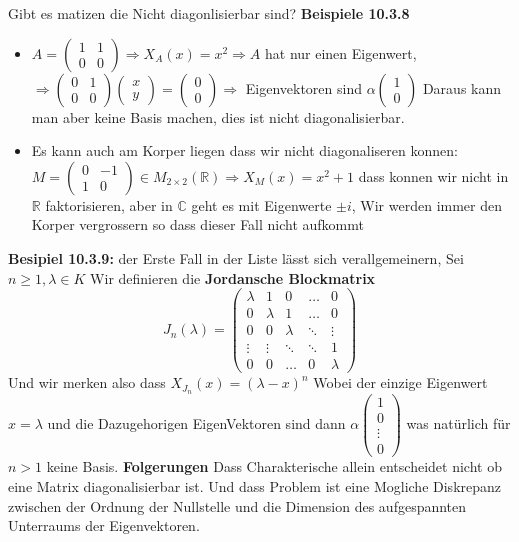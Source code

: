 \documentclass{article}
\begin{document}
Gibt es matizen die Nicht diagonlisierbar sind?\newline
\textbf{Beispiele 10.3.8} \begin{itemize}
  \item{$A=\begin{pmatrix}1&1\\0&0\end{pmatrix}\Rightarrow X_A(x)=x^2\Rightarrow A$ hat nur einen Eigenwert, $\Rightarrow\begin{pmatrix}0&1\\0&0\end{pmatrix}\begin{pmatrix}x\\y\end{pmatrix}=\begin{pmatrix}0\\0\end{pmatrix}\Rightarrow$ Eigenvektoren sind $\alpha \begin{pmatrix}1\\0\end{pmatrix}$ Daraus kann man aber keine Basis machen, dies ist nicht diagonalisierbar.}
  \item{Es kann auch am Korper liegen dass wir nicht diagonaliseren konnen: $M=\begin{pmatrix}0&-1\\1&0\end{pmatrix}\in M_{2\times2}(\mathbb{R})\Rightarrow X_M(x)=x^2+1$ dass konnen wir nicht in $\mathbb{R}$ faktorisieren, aber in $\mathbb{C}$ geht es mit Eigenwerte $\pm i$, Wir werden immer den Korper vergrossern so dass dieser Fall nicht aufkommt}    
  \end{itemize}
  \textbf{Besipiel 10.3.9:} der Erste Fall in der Liste lässt sich verallgemeinern, Sei $n\ge1, \lambda \in K$ Wir definieren die \textbf{Jordansche Blockmatrix} \[J_n(\lambda)=\begin{pmatrix}
\lambda & 1 & 0 & \dots & 0 \\
0 & \lambda & 1 & \dots & 0 \\
0 & 0 & \lambda & \ddots & \vdots \\
\vdots & \vdots & \ddots & \ddots & 1 \\
0 & 0 & \dots & 0 & \lambda
\end{pmatrix}\]
Und wir merken also dass $X_{J_n}(x)=(\lambda-x)^n$ Wobei der einzige Eigenwert $x=\lambda$ und die Dazugehorigen EigenVektoren sind dann $\alpha \begin{pmatrix}1\\0\\\vdots\\0\end{pmatrix}$ was natürlich für $n>1$ keine Basis.
\newline
\textbf{Folgerungen} Dass Charakterische allein entscheidet nicht ob eine Matrix diagonalisierbar ist. Und dass Problem ist eine Mogliche Diskrepanz zwischen der Ordnung der Nullstelle und die Dimension des aufgespannten Unterraums der Eigenvektoren.
\end{document}
